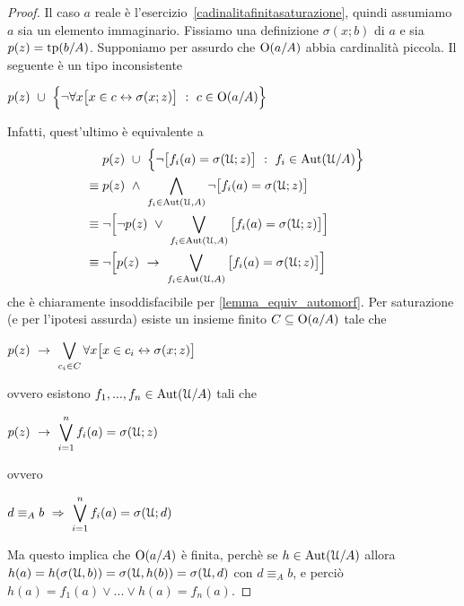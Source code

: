 \begin{proof} 
Il caso $a$ reale \`e l'esercizio~\ref{cadinalitafinitasaturazione}, quindi assumiamo $a$ sia un elemento immaginario. Fissiamo una definizione $\sigma(x;b)$ di $a$ e sia $p(z)=\textrm{tp}(b/A)$. Supponiamo per assurdo che $\textrm{O}(a/A)$ abbia cardinalit\`a piccola. Il seguente \`e un tipo inconsistente

\hfil $\displaystyle p(z)\ \cup\  \Big\{\neg\forall x\big[x\in c\leftrightarrow\sigma(x;z)\big]\ :\ c\in \textrm{O}(a/A)\Big\}$

Infatti, quest'ultimo \`e equivalente a
\begin{align*}
 				& p(z)\ \cup\  \Big\{\neg \big[f_i(a)=\sigma(\EuScript U;z)\big]\ :\ f_i\in \textrm{Aut}(\EuScript U/A)\Big\} &\\
\equiv	\;	& p(z)\ \wedge\ \bigwedge_{f_i \in \textrm{Aut}(\EuScript U,A)} \neg \big[f_i(a)=\sigma(\EuScript U;z)\big] &\\
\equiv	\;	& \neg \Big[ \neg p(z)\ \vee\ \bigvee_{f_i \in \textrm{Aut}(\EuScript U,A)} \big[f_i(a)=\sigma(\EuScript U;z)\big] \Big] &\\
\equiv	\;	& \neg \Big[ p(z)\ \rightarrow\ \bigvee_{f_i \in \textrm{Aut}(\EuScript U,A)} \big[f_i(a)=\sigma(\EuScript U;z)\big] \Big]
\end{align*}
che \`e chiaramente insoddisfacibile per \ref{lemma_equiv_automorf}. Per saturazione (e per l'ipotesi assurda) esiste un insieme finito $C\subseteq\textrm{O}(a/A)$ tale che 

\hfil $\displaystyle p(z)\ \rightarrow\ \bigvee_{c_i \in C} \forall x\big[x\in c_i\leftrightarrow\sigma(x;z)\big]$

ovvero esistono $f_1,...,f_n \in \textrm{Aut}(\EuScript U/A)$ tali che 

\hfil $\displaystyle p(z)\ \rightarrow\ \bigvee_{i=1}^n f_i(a)=\sigma(\EuScript U;z)$

ovvero 

\hfil $\displaystyle d \equiv_A b\ \IMP\ \bigvee_{i=1}^n f_i(a)=\sigma(\U;d)$

Ma questo implica che $\textrm{O}(a/A)$ \`e finita, perch\`e se $h \in \textrm{Aut}(\EuScript U/A)$ allora $h(a)=h(\sigma(\EuScript U,b))=\sigma(\EuScript U,h(b))=\sigma(\EuScript U,d)$ con $d \equiv_A b$, e perci\`o $h(a)=f_1(a) \vee ... \vee h(a)=f_n(a)$.
\end{proof}

